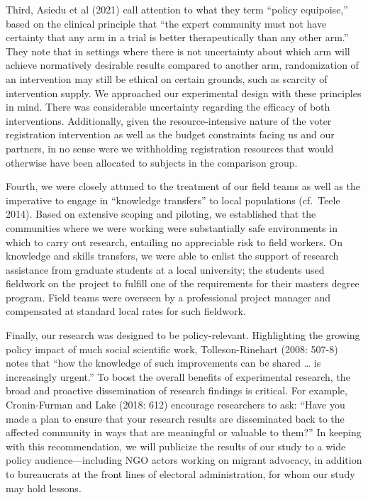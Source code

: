 \documentclass[
  11.5pt,
]{article}
\begin{document}
Third, Asiedu et al (2021) call attention to what they term ``policy
equipoise,'' based on the clinical principle that ``the expert community
must not have certainty that any arm in a trial is better
therapeutically than any other arm.'' They note that in settings where
there is not uncertainty about which arm will achieve normatively
desirable results compared to another arm, randomization of an
intervention may still be ethical on certain grounds, such as scarcity
of intervention supply. We approached our experimental design with these
principles in mind. There was considerable uncertainty regarding the
efficacy of both interventions. Additionally, given the
resource-intensive nature of the voter registration intervention as well
as the budget constraints facing us and our partners, in no sense were
we withholding registration resources that would otherwise have been
allocated to subjects in the comparison group.

Fourth, we were closely attuned to the treatment of our field teams as
well as the imperative to engage in ``knowledge transfers'' to local
populations (cf.~Teele 2014). Based on extensive scoping and piloting,
we established that the communities where we were working were
substantially safe environments in which to carry out research,
entailing no appreciable risk to field workers. On knowledge and skills
transfers, we were able to enlist the support of research assistance
from graduate students at a local university; the students used
fieldwork on the project to fulfill one of the requirements for their
masters degree program. Field teams were overseen by a professional
project manager and compensated at standard local rates for such
fieldwork.

Finally, our research was designed to be policy-relevant. Highlighting
the growing policy impact of much social scientific work,
Tolleson-Rinehart (2008: 507-8) notes that ``how the knowledge of such
improvements can be shared \ldots{} is increasingly urgent.'' To boost
the overall benefits of experimental research, the broad and proactive
dissemination of research findings is critical. For example,
Cronin-Furman and Lake (2018: 612) encourage researchers to ask: ``Have
you made a plan to ensure that your research results are disseminated
back to the affected community in ways that are meaningful or valuable
to them?'' In keeping with this recommendation, we will publicize the
results of our study to a wide policy audience---including NGO actors
working on migrant advocacy, in addition to bureaucrats at the front
lines of electoral administration, for whom our study may hold lessons.
\end{document}
